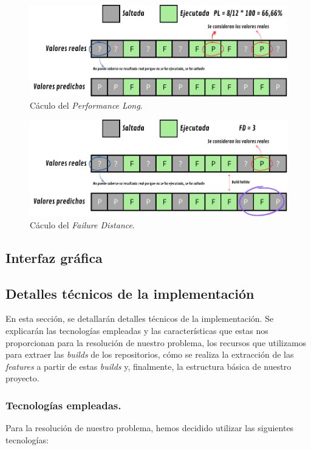 \begin{figure}[H]
    \centering
    \includegraphics[scale=0.9]{images/PL.pdf}
    \caption{Cáculo del \textit{Performance Long}.}
    \label{fig:PL}
\end{figure}

\begin{figure}[H]
    \centering
    \includegraphics[scale=0.9]{images/FD.pdf}
    \caption{Cáculo del \textit{Failure Distance}.}
    \label{fig:FD}
\end{figure}

\subsection{Interfaz gráfica}


\subsection{Detalles técnicos de la implementación}
En esta sección, se detallarán detalles técnicos de la implementación. Se explicarán las
tecnologías empleadas y las características que estas nos proporcionan para la resolución
de nuestro problema, los recursos que utilizamos para extraer las \textit{builds} de los
repositorios, cómo se realiza la extracción de las \textit{features} a partir de estas
\textit{builds} y, finalmente, la estructura básica de nuestro proyecto.

\subsubsection{Tecnologías empleadas.}
Para la resolución de nuestro problema, hemos decidido utilizar las siguientes tecnologías:

